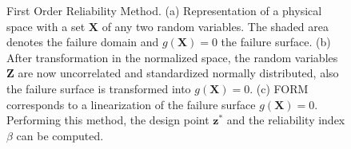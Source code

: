 \begin{figure}[h!]
  \centering
  \hfill
  \hfill
\caption[First Order Reliability Method]{First Order Reliability Method. (a) Representation of a physical space with a set $\mathbf{X}$ of any two random variables. The shaded area denotes the failure domain and $g(\mathbf{X})=0$ the failure surface. (b) After transformation in the normalized space, the random variables $\mathbf{Z}$ are now uncorrelated and standardized normally distributed, also the failure surface is transformed into $g(\mathbf{X})=0$. (c) FORM corresponds to a linearization of the failure surface $g(\mathbf{X})=0$. Performing this method, the design point $\mathbf{z}^*$ and the reliability index $\beta$ can be computed.}
  \label{fig:f-01-02-FORM}
\end{figure}

